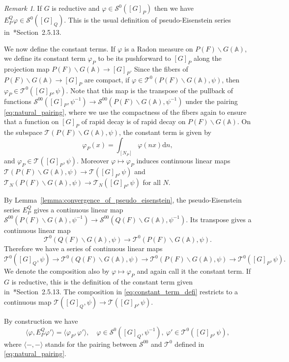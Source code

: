 \documentclass[letterpaper,11pt]{amsart}
\newcommand{\bA}{\mathbb{A}}
\newcommand{\cS}{\mathcal{S}}
\newcommand{\cT}{\mathcal{T}}
\newcommand{\rd}{\mathrm{d}}
\newcommand{\bs}{\backslash}
\newcommand{\<}{\negthickspace}
\theoremstyle{definition}
\theoremstyle{plain}
\theoremstyle{remark}
\newtheorem{remark}[definition]{Remark}
\numberwithin{equation}{section}
\begin{document}
\begin{remark}
If $G$ is reductive and $\varphi \in \cS^0([G]_P)$ then we have $E_P^Q\varphi
\in \cS^0([G]_Q)$. This is the usual definition of pseudo-Eisenstein series
in~\cite{BPCZ}*{Section~2.5.13}.
\end{remark}


We now define the constant terms. If $\varphi$ is a Radon measure on $P(F)
\bs G(\bA)$, we define its constant term $\varphi_P$ to be its pushforward to
$[G]_P$ along the projection map $P(F) \bs G(\bA) \to [G]_P$. Since the
fibers of $P(F) \bs G(\bA) \to [G]_P$ are compact, if $\varphi \in \cT^0(P(F)
\bs G(\bA), \psi)$, then $\varphi_P \in \cT^0([G]_P, \psi)$. Note that this map is
the transpose of the pullback of functions $\cS^{00}([G]_P, \psi^{-1}) \to
\cS^{00}(P(F) \bs G(\bA), \psi^{-1})$ under the pairing \eqref{eq:natural_pairing}, where we use the compactness of the fibers again to
ensure that a function on $[G]_P$ of rapid decay is of rapid decay on
$P(F) \bs G(\bA)$. On the subspace $\cT(P(F) \bs G(\bA),\psi)$, the constant
term is given by
    \[
    \varphi_P(x) = \int_{[N_P]} \varphi(nx) \rd n,
    \]
and $\varphi_P \in \cT([G]_P, \psi)$. Moreover $\varphi \mapsto \varphi_P$
induces continuous linear maps $\cT(P(F) \bs G(\bA), \psi) \to \cT([G]_P,
\psi)$ and $\cT_N(P(F) \bs G(\bA), \psi) \to \cT_N([G]_P, \psi)$ for all $N$.

By Lemma~\ref{lemma:convergence_of_pseudo_eisenstein}, the pseudo-Eisenstein
series $E_P^Q$ gives a continuous linear map $\cS^{00}(P(F) \bs G(\bA), \psi^{-1})
\to \cS^{00}(Q(F) \bs G(\bA), \psi^{-1})$. Its transpose gives a continuous
linear map
    \[
    \cT^0(Q(F) \bs G(\bA), \psi) \to \cT^0(P(F) \bs G(\bA),\psi).
    \]
Therefore we have a series of continuous linear maps
    \begin{equation}
    \label{eq:constant_term_defi}
           \cT^0([G]_Q, \psi) \to \cT^0(Q(F) \bs G(\bA), \psi) \to
    \cT^0(P(F) \bs G(\bA), \psi) \to \cT^0([G]_P, \psi).
    \end{equation}
We denote the composition also by $\varphi \mapsto \varphi_P$ and again call
it the constant term. If $G$ is reductive, this is the definition of the
constant term given in~\cite{BPCZ}*{Section~2.5.13}. The composition in \eqref{eq:constant_term_defi} restricts to a continuous map $\cT([G]_Q,\psi) \to \cT([G]_P,\psi)$.

By construction we have
    \begin{equation}    \label{eq:adjuction_pseudo_constant}
    \langle \varphi, E_P^Q \varphi' \rangle =
    \langle \varphi_P, \varphi' \rangle, \quad
    \varphi \in \cS^0([G]_Q, \psi^{-1}), \ \varphi' \in
    \cT^0([G]_P, \psi),
    \end{equation}
where $\langle-,-\rangle$ stands for the pairing between $\cS^{00}$ and
$\cT^0$ defined in \eqref{eq:natural_pairing}.
\end{document}
